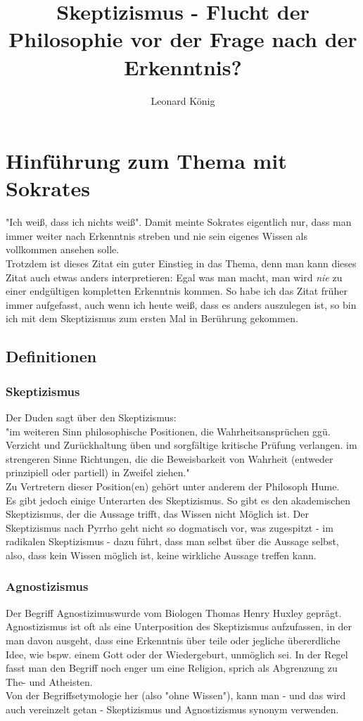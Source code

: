 \documentclass[12pt,a4paper]{article}
\author{Leonard König}
\title{Skeptizismus - Flucht der Philosophie vor der Frage nach der Erkenntnis?}
\begin{document}
\maketitle
\tableofcontents
\newpage
\section{Hinführung zum Thema mit Sokrates}
"Ich weiß, dass ich nichts weiß". Damit meinte Sokrates eigentlich nur, dass man immer weiter nach Erkenntnis streben und nie sein eigenes Wissen als vollkommen ansehen solle.%
\\Trotzdem ist dieses Zitat ein guter Einstieg in das Thema, denn man kann dieses Zitat auch etwas anders interpretieren: Egal was man macht, man wird \emph{nie} zu einer endgültigen kompletten Erkenntnis kommen.
So habe ich das Zitat früher immer aufgefasst, auch wenn ich heute weiß, dass es anders auszulegen ist, so bin ich mit dem Skeptizismus zum ersten Mal in Berührung gekommen.
	\subsection{Definitionen}
		\subsubsection{Skeptizismus}
Der Duden sagt über den Skeptizismus:\\
"im weiteren Sinn philosophische Positionen, die Wahrheitsansprüchen ggü. Verzicht und Zurückhaltung üben und sorgfältige kritische Prüfung verlangen.
im strengeren Sinne Richtungen, die die Beweisbarkeit von Wahrheit (entweder prinzipiell oder partiell) in Zweifel ziehen."%
\\Zu Vertretern dieser Position(en) gehört unter anderem 
der Philosoph Hume.\\%
Es gibt jedoch einige Unterarten des Skeptizismus. So gibt es den akademischen Skeptizismus, der die Aussage trifft, das Wissen nicht Möglich ist. Der Skeptizismus nach Pyrrho geht nicht so dogmatisch vor, was zugespitzt - im radikalen Skeptizismus - dazu führt, dass man selbst über die Aussage selbst, also, dass kein Wissen möglich ist, keine wirkliche Aussage treffen kann.%
		\subsubsection{Agnostizismus}
Der Begriff \glqq Agnostizimus\grqq wurde vom Biologen Thomas Henry Huxley geprägt. Agnostizismus ist oft als eine Unterposition des Skeptizismus aufzufassen, in der man davon ausgeht, dass eine Erkenntnis über teile oder jegliche übererdliche%
 Idee, wie bspw. einem Gott oder der Wiedergeburt, unmöglich sei. In der Regel fasst man den Begriff noch enger um eine Religion, sprich als Abgrenzung zu The- und Atheisten.\\ 
Von der Begriffsetymologie her (also "ohne Wissen"), kann man - und das wird auch vereinzelt getan - Skeptizismus und Agnostizismus synonym verwenden.
\end{document}
